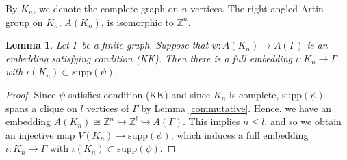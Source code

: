 \documentclass{amsart}
\theoremstyle{definition}
\theoremstyle{plain}
\newtheorem{lemma}[definition]{Lemma}
\numberwithin{equation}{section}
\begin{document}

By $K_n$, we denote the complete graph on $n$ vertices. 
The right-angled Artin group on $K_n$, $A(K_n)$, is isomorphic to $\mathbb{Z}^n$. 

\begin{lemma}
Let $\Gamma$ be a finite graph. 
Suppose that $\psi \colon A(K_n) \rightarrow A(\Gamma)$ is an embedding satisfying condition (KK). 
Then there is a full embedding $\iota \colon K_n \rightarrow \Gamma$ with $\iota (K_n) \subset \mathrm{supp}(\psi)$. 
\label{Abel}
\end{lemma}
\begin{proof}
Since $\psi$ satisfies condition (KK) and since $K_n$ is complete, $\mathrm{supp}(\psi)$ spans a clique on $l$ vertices of $\Gamma$ by Lemma \ref{commutative}. 
Hence, we have an embedding $A(K_n) \cong \mathbb{Z}^n \hookrightarrow \mathbb{Z}^l \hookrightarrow A(\Gamma)$. 
This implies $n \leq l$, and so we obtain an injective map $V(K_n) \rightarrow \mathrm{supp}(\psi)$, which induces a full embedding $\iota \colon K_n \rightarrow \Gamma$ with $\iota (K_n) \subset \mathrm{supp}(\psi)$. 
\end{proof}
\end{document}
